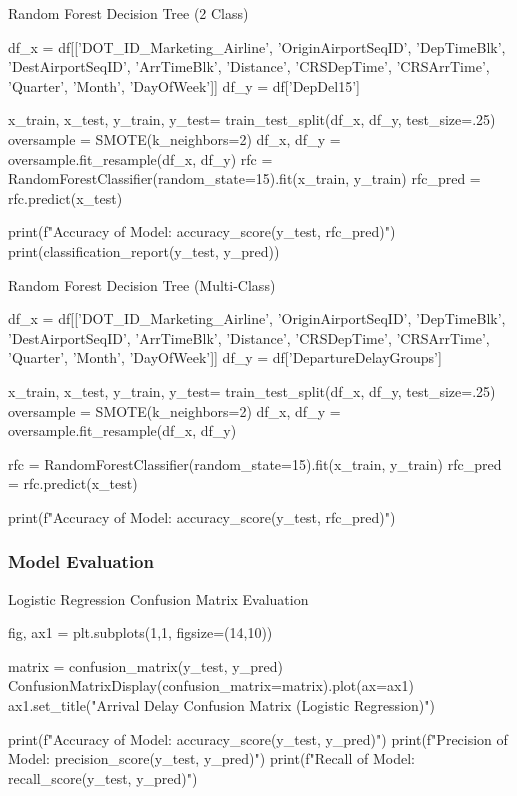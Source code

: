 \documentclass[a4paper,12pt]{article}
\begin{document}
Random Forest Decision Tree (2 Class)

\begin{python}
df_x = df[['DOT_ID_Marketing_Airline', 'OriginAirportSeqID', 'DepTimeBlk', 'DestAirportSeqID', 'ArrTimeBlk', 'Distance', 'CRSDepTime',
 'CRSArrTime', 'Quarter', 'Month', 'DayOfWeek']]
df_y = df['DepDel15']

x_train, x_test, y_train, y_test= train_test_split(df_x, df_y, test_size=.25)
oversample = SMOTE(k_neighbors=2)
df_x, df_y = oversample.fit_resample(df_x, df_y)
rfc = RandomForestClassifier(random_state=15).fit(x_train, y_train)
rfc_pred = rfc.predict(x_test)

print(f"Accuracy of Model: {accuracy_score(y_test, rfc_pred)}")
print(classification_report(y_test, y_pred))
\end{python}

Random Forest Decision Tree (Multi-Class)

\begin{python}
df_x = df[['DOT_ID_Marketing_Airline', 'OriginAirportSeqID', 'DepTimeBlk', 'DestAirportSeqID', 'ArrTimeBlk', 'Distance', 'CRSDepTime',
 'CRSArrTime', 'Quarter', 'Month', 'DayOfWeek']]
df_y = df['DepartureDelayGroups']

x_train, x_test, y_train, y_test= train_test_split(df_x, df_y, test_size=.25)
oversample = SMOTE(k_neighbors=2)
df_x, df_y = oversample.fit_resample(df_x, df_y)

rfc = RandomForestClassifier(random_state=15).fit(x_train, y_train)
rfc_pred = rfc.predict(x_test)

print(f"Accuracy of Model: {accuracy_score(y_test, rfc_pred)}")
\end{python}

\subsubsection{Model Evaluation}

Logistic Regression Confusion Matrix Evaluation

\begin{python}
fig, ax1 = plt.subplots(1,1, figsize=(14,10))

matrix = confusion_matrix(y_test, y_pred)
ConfusionMatrixDisplay(confusion_matrix=matrix).plot(ax=ax1)
ax1.set_title("Arrival Delay Confusion Matrix (Logistic Regression)")

print(f"Accuracy of Model: {accuracy_score(y_test, y_pred)}")
print(f"Precision of Model: {precision_score(y_test, y_pred)}")
print(f"Recall of Model: {recall_score(y_test, y_pred)}")
\end{python}
\end{document}
